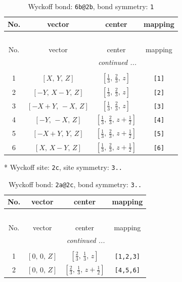 \documentclass[fleqn,8pt]{jsarticle}
\begin{document}
\renewcommand{\arraystretch}{1.2}
\begin{longtable}{cccc}
\caption{Wyckoff bond: {\tt 6b@2b}, bond symmetry: {\tt 1}}
 \\
 \hline \hline
No. & vector & center & mapping \\ \hline \endfirsthead

\multicolumn{3}{l}{\tablename\ \thetable{}} \\
 \hline \hline
No. & vector & center & mapping \\ \hline \endhead

 \hline \hline
\multicolumn{3}{r}{\footnotesize\it continued ...} \\ \endfoot

 \hline \hline
\multicolumn{3}{r}{} \\ \endlastfoot

1 & $\left[ X,\, Y,\, Z \right]$ & $\left[ \frac{1}{3},\, \frac{2}{3},\, z \right]$ & {\tt [1]} \\ \hline
2 & $\left[ - Y,\, X - Y,\, Z \right]$ & $\left[ \frac{1}{3},\, \frac{2}{3},\, z \right]$ & {\tt [2]} \\ \hline
3 & $\left[ - X + Y,\, - X,\, Z \right]$ & $\left[ \frac{1}{3},\, \frac{2}{3},\, z \right]$ & {\tt [3]} \\ \hline
4 & $\left[ - Y,\, - X,\, Z \right]$ & $\left[ \frac{1}{3},\, \frac{2}{3},\, z + \frac{1}{2} \right]$ & {\tt [4]} \\ \hline
5 & $\left[ - X + Y,\, Y,\, Z \right]$ & $\left[ \frac{1}{3},\, \frac{2}{3},\, z + \frac{1}{2} \right]$ & {\tt [5]} \\ \hline
6 & $\left[ X,\, X - Y,\, Z \right]$ & $\left[ \frac{1}{3},\, \frac{2}{3},\, z + \frac{1}{2} \right]$ & {\tt [6]} \\
\end{longtable}
* Wyckoff site: {\tt 2c}, site symmetry: {\tt 3..}
\renewcommand{\arraystretch}{1.2}
\begin{longtable}{cccc}
\caption{Wyckoff bond: {\tt 2a@2c}, bond symmetry: {\tt 3..}}
 \\
 \hline \hline
No. & vector & center & mapping \\ \hline \endfirsthead

\multicolumn{3}{l}{\tablename\ \thetable{}} \\
 \hline \hline
No. & vector & center & mapping \\ \hline \endhead

 \hline \hline
\multicolumn{3}{r}{\footnotesize\it continued ...} \\ \endfoot

 \hline \hline
\multicolumn{3}{r}{} \\ \endlastfoot

1 & $\left[ 0,\, 0,\, Z \right]$ & $\left[ \frac{2}{3},\, \frac{1}{3},\, z \right]$ & {\tt [1,2,3]} \\ \hline
2 & $\left[ 0,\, 0,\, Z \right]$ & $\left[ \frac{2}{3},\, \frac{1}{3},\, z + \frac{1}{2} \right]$ & {\tt [4,5,6]} \\
\end{longtable}
\end{document}
